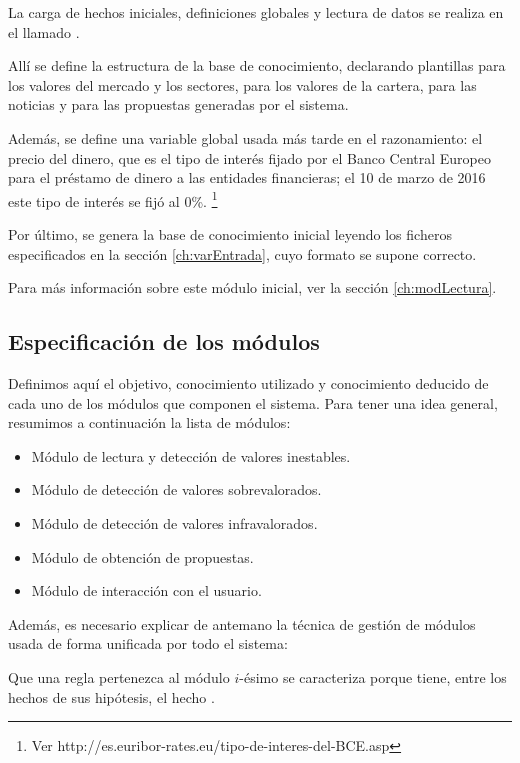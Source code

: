 \documentclass[a4paper, 11pt, titlepage]{article}
\begin{document}
    La carga de hechos iniciales, definiciones globales y lectura de datos se realiza en el llamado .

    Allí se define la estructura de la base de conocimiento, declarando plantillas para los valores del mercado y los sectores, para los valores de la cartera, para las noticias y para las propuestas generadas por el sistema.

    Además, se define una variable global usada más tarde en el razonamiento: el precio del dinero, que es el tipo de interés fijado por el Banco Central Europeo para el préstamo de dinero a las entidades financieras; el 10 de marzo de 2016 este tipo de interés se fijó al 0\%. \footnote{Ver http://es.euribor-rates.eu/tipo-de-interes-del-BCE.asp}

    Por último, se genera la base de conocimiento inicial leyendo los ficheros especificados en la sección \ref{ch:varEntrada}, cuyo formato se supone correcto.

    Para más información sobre este módulo inicial, ver la sección \ref{ch:modLectura}.

    \subsection{Especificación de los módulos}

    Definimos aquí el objetivo, conocimiento utilizado y conocimiento deducido de cada uno de los módulos que componen el sistema. Para tener una idea general, resumimos a continuación la lista de módulos:

    \begin{itemize}
        \item Módulo de lectura y detección de valores inestables.
        \item Módulo de detección de valores sobrevalorados.
        \item Módulo de detección de valores infravalorados.
        \item Módulo de obtención de propuestas.
        \item Módulo de interacción con el usuario.
    \end{itemize}

    Además, es necesario explicar de antemano la técnica de gestión de módulos usada de forma unificada por todo el sistema:

    Que una regla pertenezca al módulo $i$-ésimo se caracteriza porque tiene, entre los hechos de sus hipótesis, el hecho .
\end{document}
